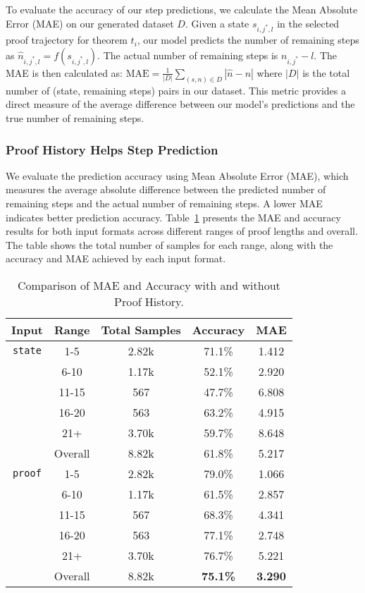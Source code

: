 To evaluate the accuracy of our step predictions, we calculate the Mean Absolute Error (MAE) on our generated dataset $D$. Given a state $s_{i,j^*,l}$ in the selected proof trajectory for theorem $t_i$, our model predicts the number of remaining steps as $\hat{n}_{i,j^*,l} = f(s_{i,j^*,l})$. The actual number of remaining steps is $n_{i,j^*} - l$. The MAE is then calculated as:
$\text{MAE} = \frac{1}{|D|} \sum_{(s, n) \in D} |\hat{n} - n|$
where $|D|$ is the total number of (state, remaining steps) pairs in our dataset. This metric provides a direct measure of the average difference between our model's predictions and the true number of remaining steps.


\subsubsection{Proof History Helps Step Prediction}

We evaluate the prediction accuracy using Mean Absolute Error (MAE), which measures the average absolute difference between the predicted number of remaining steps and the actual number of remaining steps. A lower MAE indicates better prediction accuracy. Table~\ref{tab:proof_history_results} presents the MAE and accuracy results for both input formats across different ranges of proof lengths and overall. The table shows the total number of samples for each range, along with the accuracy and MAE achieved by each input format.

\begin{table}[h]
    \centering
    \begin{tabular}{ccccc}
        \toprule
        Input & Range & Total Samples & Accuracy & MAE \\
        \midrule
        {\texttt{state}} & 1-5 & 2.82k & 71.1\% & 1.412 \\
        & 6-10 & 1.17k & 52.1\% & 2.920 \\
        & 11-15 & 567 & 47.7\% & 6.808 \\
        & 16-20 & 563 & 63.2\% & 4.915 \\
        & 21+ & 3.70k & 59.7\% & 8.648 \\
        & Overall & 8.82k & 61.8\% & 5.217 \\
        \midrule
        {\texttt{proof}} & 1-5 & 2.82k & 79.0\% & 1.066 \\
        & 6-10 & 1.17k & 61.5\% & 2.857 \\
        & 11-15 & 567 & 68.3\% & 4.341 \\
        & 16-20 & 563 & 77.1\% & 2.748 \\
        & 21+ & 3.70k & 76.7\% & 5.221 \\
        & Overall & 8.82k  & \textbf{75.1\%} & \textbf{3.290} \\
        \bottomrule
    \end{tabular}
    \caption{Comparison of MAE and Accuracy with and without Proof History.}
    \label{tab:proof_history_results}
\end{table}

